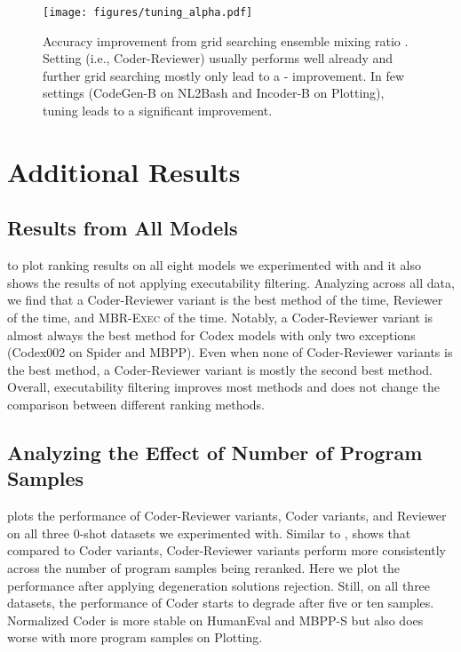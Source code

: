 \documentclass[nohyperref]{article}
\theoremstyle{plain}
\theoremstyle{definition}
\theoremstyle{remark}
\begin{document}
\begin{figure*}[ht!]
     \centering
     \texttt{[image: figures/tuning\_alpha.pdf]}
     \caption{Accuracy improvement from grid searching ensemble mixing ratio . Setting  (i.e., Coder-Reviewer) usually performs well already and further grid searching mostly only lead to a - improvement. In few settings (CodeGen-B on NL2Bash and Incoder-B on Plotting), tuning  leads to a significant improvement.}
     \label{fig:tuning_alpha}
     \vspace{-5pt}
\end{figure*}

\section{Additional Results}
\label{sec:app-results}
\subsection{Results from All Models}
\label{sec:app-all-results}
 to  plot ranking results on all eight models we experimented with and it also shows the results of not applying executability filtering.
Analyzing across all data, we find that a Coder-Reviewer variant is the best method  of the time, Reviewer  of the time, and MBR-\textsc{Exec}  of the time.
Notably, a Coder-Reviewer variant is almost always the best method for Codex models with only two exceptions (Codex002 on Spider and MBPP).
Even when none of Coder-Reviewer variants is the best method, a Coder-Reviewer variant is mostly the second best method.
Overall, executability filtering improves most methods and does not change the comparison between different ranking methods.

\subsection{Analyzing the Effect of Number of Program Samples}
\label{sec:app-samples}
 plots the performance of Coder-Reviewer variants, Coder variants, and Reviewer on all three 0-shot datasets we experimented with.
Similar to ,  shows that compared to Coder variants, Coder-Reviewer variants perform more consistently across the number of program samples being reranked.
Here we plot the performance after applying degeneration solutions rejection.
Still, on all three datasets, the performance of Coder starts to degrade after five or ten samples.
Normalized Coder is more stable on HumanEval and MBPP-S but also does worse with more program samples on Plotting.
\end{document}
